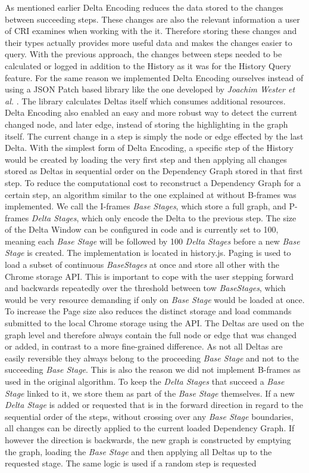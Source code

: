 As mentioned earlier Delta Encoding reduces the data stored to the changes between succeeding steps. These changes are also the relevant information a user of CRI examines when working with the it. Therefore storing these changes and their types actually provides more useful data and makes the changes easier to query. With the previous approach, the changes between steps needed to be calculated or logged in addition to the History as it was for the History Query feature. For the same reason we implemented Delta Encoding ourselves instead of using a JSON Patch \cite{JSONPatch} based library like the one developed by \emph{Joachim Wester et al.} \cite{JSONPatchImplementation}. The library calculates Deltas itself which consumes additional resources. Delta Encoding also enabled an easy and more robust way to detect the current changed node, and later edge, instead of storing the highlighting in the graph itself. The current change in a step is simply the node or edge effected by the last Delta. With the simplest form of Delta Encoding, a specific step of the History would be created by loading the very first step and then applying all changes stored as Deltas in sequential order on the Dependency Graph stored in that first step. To reduce the computational cost to reconstruct a Dependency Graph for a certain step, an algorithm similar to the one explained at \cite{VideoEncoding} without B-frames was implemented. We call the I-frames \emph{Base Stages}, which store a full graph, and P-frames \emph{Delta Stages}, which only encode the Delta to the previous step. The size of the Delta Window can be configured in code and is currently set to 100, meaning each \emph{Base Stage} will be followed by 100 \emph{Delta Stages} before a new \emph{Base Stage} is created. The implementation is located in history.js. Paging is used to load a subset of continuous \emph{BaseStages} at once and store all other with the Chrome storage API. This is important to cope with the user stepping forward and backwards repeatedly over the threshold between tow \emph{BaseStages}, which would be very resource demanding if only on \emph{Base Stage} would be loaded at once. To increase the Page size also reduces the distinct storage and load commands submitted to the local Chrome storage using the API. The Deltas are used on the graph level and therefore always contain the full node or edge that was changed or added, in contrast to a more fine-grained difference. As not all Deltas are easily reversible they always belong to the proceeding \emph{Base Stage} and not to the succeeding \emph{Base Stage}. This is also the reason we did not implement B-frames as used in the original algorithm. To keep the \emph{Delta Stages} that succeed a \emph{Base Stage} linked to it, we store them as part of the \emph{Base Stage} themselves. If a new \emph{Delta Stage} is added or requested that is in the forward direction in regard to the sequential order of the steps, without crossing over any \emph{Base Stage} boundaries, all changes can be directly applied to the current loaded Dependency Graph. If however the direction is backwards, the new graph is constructed by emptying the graph, loading the \emph{Base Stage} and then applying all Deltas up to the requested stage. The same logic is used if a random step is requested 